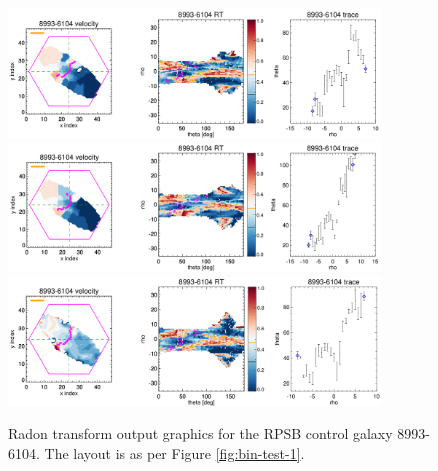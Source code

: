 \documentclass[fleqn,usenatbib]{mnras}
\begin{document}
\begin{figure}
    \centering
    \includegraphics[width=0.88\textwidth]{Images/bin-test/8993-6104-1-1-250-10-HYB10.png}
    \includegraphics[width=0.88\textwidth]{Images/bin-test/8993-6104-1-1-250-10-VOR10.png}
    \includegraphics[width=0.88\textwidth]{Images/bin-test/8993-6104-1-1-250--10-SPX.png}    
    \caption{Radon transform output graphics for the RPSB control galaxy 8993-6104. The layout is as per Figure \ref{fig:bin-test-1}.}
    \label{fig:bin-test-3}
\end{figure}
\end{document}
